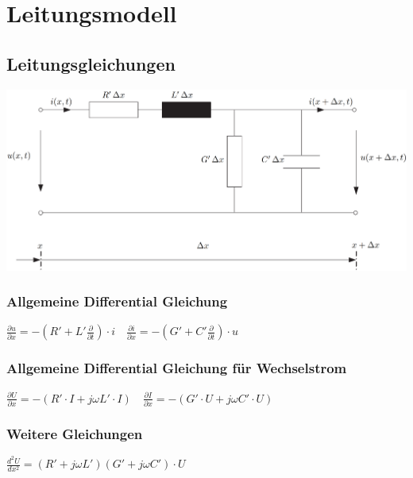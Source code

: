 \newcolumn
\section{Leitungsmodell}

\subsection{Leitungsgleichungen}
\includegraphics[width=0.98\columnwidth, align=c]{images/Leitungsgleichungen_1.png}

\subsubsection{Allgemeine Differential Gleichung}
 
    \vspace{0.15cm}
    $
    \boxed{\frac{\partial u}{\partial x} = -\left(R' + L' \frac{\partial}{\partial t}\right)  \cdot i}
    \quad
    \boxed{\frac{\partial i}{\partial x} = -\left(G' + C' \frac{\partial}{\partial t}\right)  \cdot u}
    $
    \vspace{0.15cm}

\subsubsection{Allgemeine Differential Gleichung für Wechselstrom}
    
    \vspace{0.15cm}
    $
    \boxed{\frac{\partial U}{\partial x} = -\left(R' \cdot I + j \omega L' \cdot I\right)}
    \quad
    \boxed{\frac{\partial I}{\partial x} = -\left(G' \cdot U + j \omega C' \cdot U\right)}
    $

\subsubsection{Weitere Gleichungen}

$
\boxed{\frac{d^2 U}{dx^2} = \left(R' + j \omega L'\right)\left(G' + j \omega C'\right) \cdot U}
$

